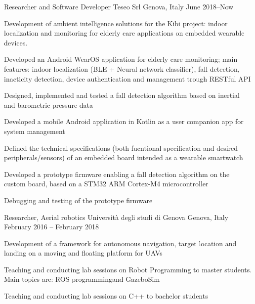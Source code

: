 

\begin{cventries}

  \cventry
    {Researcher and Software Developer} %
    {Teseo Srl} %
    {Genova, Italy} %
    {June 2018--Now} %
    {
      Development of ambient intelligence solutions for the Kibi project: indoor localization and monitoring for elderly care applications on embedded wearable devices.
      \vspace*{16pt}
      \begin{cvitems} %
        \item {Developed an Android WearOS application for elderly care monitoring; main features: indoor localization (BLE + Neural network classifier), fall detection, inacticity detection, device authentication and management trough RESTful API}
        \item {Designed, implemented and tested a fall detection algorithm based on inertial and barometric pressure data}
        \item {Developed a mobile Android application in Kotlin as a user companion app for system management}
        \item {Defined the technical specifications (both fucntional specification and desired peripherals/sensors) of an embedded board intended as a wearable smartwatch}
        \item {
          Developed a prototype firmware enabling a fall detection algorithm on the custom board, based on a STM32 ARM Cortex-M4 microcontroller
        }
        \item{Debugging and testing of the prototype firmware} 
      \end{cvitems}
    }

  \cventry
    {Researcher, Aerial robotics} %
    {Università degli studi di Genova} %
    {Genova, Italy} %
    {February 2016 – February 2018} %
    {
      Development of a framework for autonomous navigation, target location and landing on a moving and floating platform for UAVs
      \vspace*{16pt}
      \begin{cvitems} %
        \item {Teaching and conducting lab sessions on Robot Programming to master students. Main topics are: ROS programmingand GazeboSim}
        \item {Teaching and conducting lab sessions on C++ to bachelor students}
     \end{cvitems}
    }


\end{cventries}
